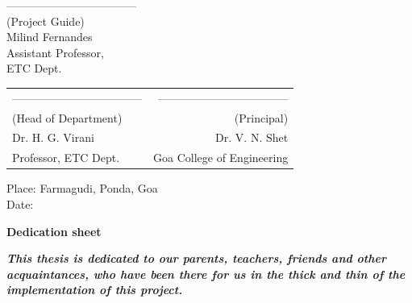 \noindent -----------------------------------\\
(Project Guide)\\
Milind Fernandes\\
Assistant Professor,\\
ETC Dept.\\



\begin{table}[H]
\begin{tabular}{lr}
\noindent ----------------------------------- & \hspace{6cm} ----------------------------------- \\
(Head of Department) & (Principal)\\
Dr. H. G. Virani & Dr. V. N. Shet\\
Professor, ETC Dept. & Goa College of Engineering\\
\end{tabular}
\end{table}
\noindent Place: Farmagudi, Ponda, Goa\\
\noindent Date: 

\newpage

\begin{center}
\begin{huge}
\bfseries{Dedication sheet}
\end{huge}
\end{center}
\textbf{\textit {This thesis is dedicated to our parents, teachers, friends and
other acquaintances, who have been there for us in the thick
and thin of the implementation of this project.}}